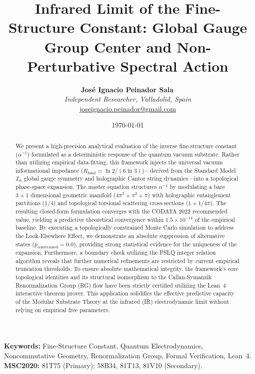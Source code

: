 \documentclass[12pt,a4paper]{article}
\title{Infrared Limit of the Fine-Structure Constant: Global Gauge Group Center and Non-Perturbative Spectral Action}
\author{
  \textbf{José Ignacio Peinador Sala}\,\orcidlink{0009-0008-1822-3452} \\
  \textit{Independent Researcher, Valladolid, Spain} \\
  \small\href{mailto:joseignacio.peinador@gmail.com}{joseignacio.peinador@gmail.com}
}
\date{\today}
\begin{document}
\maketitle


\begin{abstract}
We present a high-precision analytical evaluation of the inverse fine-structure constant ($\alpha^{-1}$) formulated as a deterministic response of the quantum vacuum substrate. Rather than utilizing empirical data-fitting, this framework injects the universal vacuum informational impedance ($R_{\text{fund}} = \ln 2 / (6 \ln 3)$)—derived from the Standard Model $\mathbb{Z}_6$ global gauge symmetry and holographic Cantor string dynamics—into a topological phase-space expansion. The master equation structures $\alpha^{-1}$ by modulating a bare $3+1$ dimensional geometric manifold ($4\pi^3 + \pi^2 + \pi$) with holographic entanglement partitions ($1/4$) and topological torsional scattering cross-sections ($1 + 1/4\pi$). The resulting closed-form formulation converges with the CODATA 2022 recommended value, yielding a predictive theoretical convergence within $1.5 \times 10^{-14}$ of the empirical baseline. By executing a topologically constrained Monte Carlo simulation to address the Look-Elsewhere Effect, we demonstrate an absolute suppression of alternative states ($p_{\text{constrained}} = 0.0$), providing strong statistical evidence for the uniqueness of the expansion. Furthermore, a boundary check utilizing the PSLQ integer relation algorithm reveals that further numerical refinements are restricted by current empirical truncation thresholds. To ensure absolute mathematical integrity, the framework's core topological identities and its structural isomorphism to the Callan-Symanzik Renormalization Group (RG) flow have been strictly certified utilizing the Lean~4 interactive theorem prover. This application solidifies the effective predictive capacity of the Modular Substrate Theory at the infrared (IR) electrodynamic limit without relying on empirical free parameters.
\end{abstract}

\noindent\textbf{Keywords:} Fine-Structure Constant, Quantum Electrodynamics, Noncommutative Geometry, Renormalization Group, Formal Verification, Lean~4. \\
\noindent\textbf{MSC2020:} 81T75 (Primary); 58B34, 81T13, 81V10 (Secondary).


\end{document}
